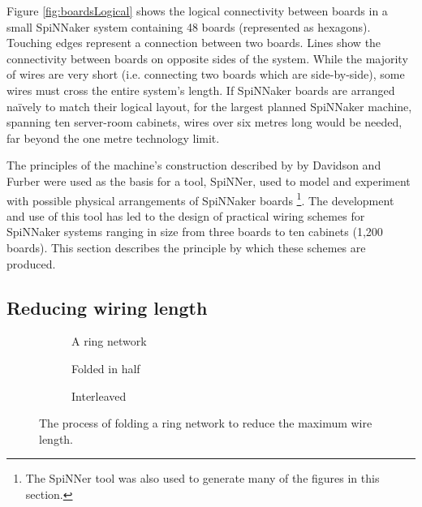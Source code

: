 		Figure \ref{fig:boardsLogical} shows the logical connectivity between boards
		in a small SpiNNaker system containing 48 boards (represented as hexagons).
		Touching edges represent a connection between two boards. Lines show the
		connectivity between boards on opposite sides of the system. While the
		majority of wires are very short (i.e. connecting two boards which are
		side-by-side), some wires must cross the entire system's length. If
		SpiNNaker boards are arranged na\"ively to match their logical layout, for
		the largest planned SpiNNaker machine, spanning ten server-room cabinets,
		wires over six metres long would be needed, far beyond the one metre
		technology limit.
		
		The principles of the machine's construction described by by Davidson
		\cite{davidsonWiring} and Furber \cite{furber13email} were used as the basis
		for a tool, SpiNNer, used to model and experiment with possible physical
		arrangements of SpiNNaker boards \footnote{The SpiNNer tool was also used to
		generate many of the figures in this section.}. The development and use of
		this tool has led to the design of practical wiring schemes for SpiNNaker
		systems ranging in size from three boards to ten cabinets (1,200 boards).
		This section describes the principle by which these schemes are produced.
		
		\subsection{Reducing wiring length}
			
			\begin{figure}
				\begin{subfigure}[b]{\textwidth}
					\center
					
					\caption{A ring network}
					\label{fig:ringLong}
				\end{subfigure}
				
				\vspace{2ex}
				
				\begin{subfigure}[b]{\textwidth}
					\center
					
					\caption{Folded in half}
					\label{fig:ringFolded}
				\end{subfigure}
				
				\vspace{2ex}
				
				\begin{subfigure}[b]{\textwidth}
					\center
					
					\caption{Interleaved}
					\label{fig:ringInterleaved}
				\end{subfigure}
				
				\caption[Folding a ring network.]{The process of folding a ring network
				to reduce the maximum wire length.}
				\label{fig:folding}
			\end{figure}
			
